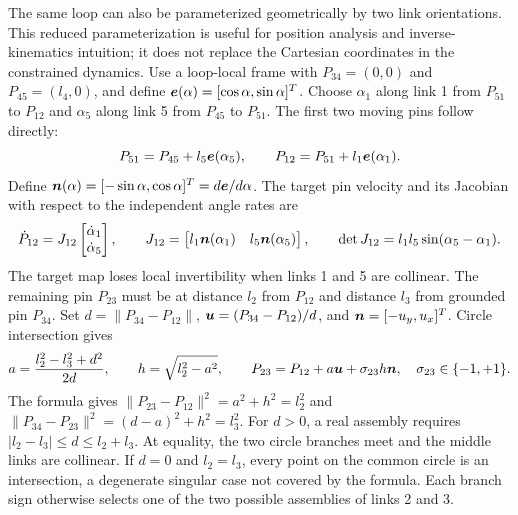 \documentclass[../main.tex]{subfiles}
\begin{document}
The same loop can also be parameterized geometrically by two link orientations. This reduced parameterization is useful for position analysis and inverse-kinematics intuition; it does not replace the Cartesian coordinates in the constrained dynamics. Use a loop-local frame with $P_{34}=(0,0)$ and $P_{45}=(l_4,0)$, and define $\boldsymbol{e}(\alpha)=[\cos\alpha,\sin\alpha]^T$. Choose $\alpha_1$ along link 1 from $P_{51}$ to $P_{12}$ and $\alpha_5$ along link 5 from $P_{45}$ to $P_{51}$. The first two moving pins follow directly:
\begin{equation}
P_{51}=P_{45}+l_5\boldsymbol{e}(\alpha_5),
\qquad
P_{12}=P_{51}+l_1\boldsymbol{e}(\alpha_1).
\label{eq:five-link-forward-independent-pins}
\end{equation}
Define $\boldsymbol{n}(\alpha)=[-\sin\alpha,\cos\alpha]^T=d\boldsymbol{e}/d\alpha$. The target pin velocity and its Jacobian with respect to the independent angle rates are
\begin{equation}
\dot P_{12}=J_{12}\begin{bmatrix}\dot\alpha_1\\\dot\alpha_5\end{bmatrix},
\qquad
J_{12}=\begin{bmatrix}l_1\boldsymbol{n}(\alpha_1)&l_5\boldsymbol{n}(\alpha_5)\end{bmatrix},
\qquad
\det J_{12}=l_1l_5\sin(\alpha_5-\alpha_1).
\label{eq:five-link-independent-jacobian}
\end{equation}
The target map loses local invertibility when links 1 and 5 are collinear.
The remaining pin $P_{23}$ must be at distance $l_2$ from $P_{12}$ and distance $l_3$ from grounded pin $P_{34}$. Set $d=\|P_{34}-P_{12}\|$, $\boldsymbol{u}=(P_{34}-P_{12})/d$, and $\boldsymbol{n}=[-u_y,u_x]^T$. Circle intersection gives
\begin{equation}
a=\frac{l_2^2-l_3^2+d^2}{2d},
\qquad h=\sqrt{l_2^2-a^2},
\qquad P_{23}=P_{12}+a\boldsymbol{u}+\sigma_{23}h\boldsymbol{n},
\quad \sigma_{23}\in\{-1,+1\}.
\label{eq:five-link-forward-loop-closure}
\end{equation}
The formula gives $\|P_{23}-P_{12}\|^2=a^2+h^2=l_2^2$ and $\|P_{34}-P_{23}\|^2=(d-a)^2+h^2=l_3^2$. For $d>0$, a real assembly requires $|l_2-l_3|\le d\le l_2+l_3$. At equality, the two circle branches meet and the middle links are collinear. If $d=0$ and $l_2=l_3$, every point on the common circle is an intersection, a degenerate singular case not covered by the formula. Each branch sign otherwise selects one of the two possible assemblies of links 2 and 3.
\end{document}
